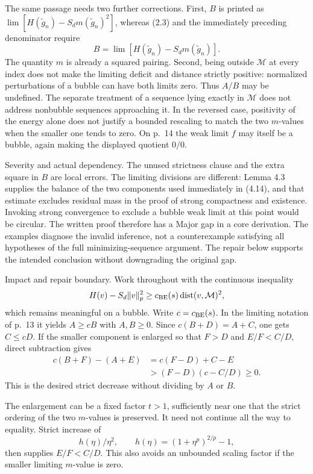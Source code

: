 \documentclass[10pt]{article}
\begin{document}
The same passage needs two further corrections. First, \(B\) is printed as \(\lim[H(\widetilde g_n)-S_dm(\widetilde g_n)^2]\), whereas (2.3) and the immediately preceding denominator require \[B=\lim[H(\widetilde g_n)-S_dm(\widetilde g_n)].\] The quantity \(m\) is already a squared pairing. Second, being outside \(\mathcal M\) at every index does not make the limiting deficit and distance strictly positive: normalized perturbations of a bubble can have both limits zero. Thus \(A/B\) may be undefined. The separate treatment of a sequence lying exactly in \(\mathcal M\) does not address nonbubble sequences approaching it. In the reversed case, positivity of the energy alone does not justify a bounded rescaling to match the two \(m\)-values when the smaller one tends to zero. On p. 14 the weak limit \(f\) may itself be a bubble, again making the displayed quotient \(0/0\).\par
Severity and actual dependency. The unused strictness clause and the extra square in \(B\) are local errors. The limiting divisions are different: Lemma 4.3 supplies the balance of the two components used immediately in (4.14), and that estimate excludes residual mass in the proof of strong compactness and existence. Invoking strong convergence to exclude a bubble weak limit at this point would be circular. The written proof therefore has a Major gap in a core derivation. The examples diagnose the invalid inference, not a counterexample satisfying all hypotheses of the full minimizing-sequence argument. The repair below supports the intended conclusion without downgrading the original gap.\par
Impact and repair boundary. Work throughout with the continuous inequality \[H(v)-S_d\|v\|_p^2\ge c_{\rm BE}(s)\operatorname{dist}(v,\mathcal M)^2,\] which remains meaningful on a bubble. Write \(c=c_{\rm BE}(s)\). In the limiting notation of p. 13 it yields \(A\ge cB\) with \(A,B\ge0\). Since \(c(B+D)=A+C\), one gets \(C\le cD\). If the smaller component is enlarged so that \(F>D\) and \(E/F<C/D\), direct subtraction gives \[\begin{aligned}
 c(B+F)-(A+E)
 &=c(F-D)+C-E\\
 &>(F-D)(c-C/D)\ge0.
 \end{aligned}                                                    \tag{2.1}\] This is the desired strict decrease without dividing by \(A\) or \(B\).\par
The enlargement can be a fixed factor \(t>1\), sufficiently near one that the strict ordering of the two \(m\)-values is preserved. It need not continue all the way to equality. Strict increase of \[h(\eta)/\eta^2,\qquad h(\eta)=(1+\eta^p)^{2/p}-1,\] then supplies \(E/F<C/D\). This also avoids an unbounded scaling factor if the smaller limiting \(m\)-value is zero.\par
\end{document}
